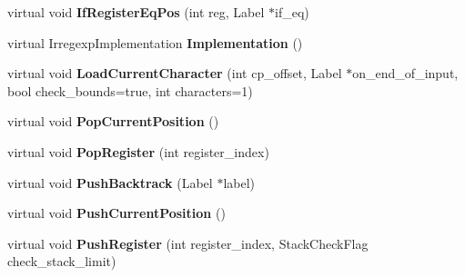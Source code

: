 \begin{DoxyCompactItemize}
\item 
\hypertarget{classv8_1_1internal_1_1_reg_exp_macro_assembler_tracer_a7de6f340567bbd0d28db32177d03995c}{}virtual void {\bfseries If\+Register\+Eq\+Pos} (int reg, Label $\ast$if\+\_\+eq)\label{classv8_1_1internal_1_1_reg_exp_macro_assembler_tracer_a7de6f340567bbd0d28db32177d03995c}

\item 
\hypertarget{classv8_1_1internal_1_1_reg_exp_macro_assembler_tracer_acb598ed5fdd8816f391f13a5518aced6}{}virtual Irregexp\+Implementation {\bfseries Implementation} ()\label{classv8_1_1internal_1_1_reg_exp_macro_assembler_tracer_acb598ed5fdd8816f391f13a5518aced6}

\item 
\hypertarget{classv8_1_1internal_1_1_reg_exp_macro_assembler_tracer_a484bc51c470fe1b603a7c744a21df877}{}virtual void {\bfseries Load\+Current\+Character} (int cp\+\_\+offset, Label $\ast$on\+\_\+end\+\_\+of\+\_\+input, bool check\+\_\+bounds=true, int characters=1)\label{classv8_1_1internal_1_1_reg_exp_macro_assembler_tracer_a484bc51c470fe1b603a7c744a21df877}

\item 
\hypertarget{classv8_1_1internal_1_1_reg_exp_macro_assembler_tracer_ad93ed40ef832641f6f3c6309fcd4cc05}{}virtual void {\bfseries Pop\+Current\+Position} ()\label{classv8_1_1internal_1_1_reg_exp_macro_assembler_tracer_ad93ed40ef832641f6f3c6309fcd4cc05}

\item 
\hypertarget{classv8_1_1internal_1_1_reg_exp_macro_assembler_tracer_a9d77d1ca2b521e5d8d6650ec9ebe9722}{}virtual void {\bfseries Pop\+Register} (int register\+\_\+index)\label{classv8_1_1internal_1_1_reg_exp_macro_assembler_tracer_a9d77d1ca2b521e5d8d6650ec9ebe9722}

\item 
\hypertarget{classv8_1_1internal_1_1_reg_exp_macro_assembler_tracer_a8a8ef8929ec481c91822bee014ce5ba4}{}virtual void {\bfseries Push\+Backtrack} (Label $\ast$label)\label{classv8_1_1internal_1_1_reg_exp_macro_assembler_tracer_a8a8ef8929ec481c91822bee014ce5ba4}

\item 
\hypertarget{classv8_1_1internal_1_1_reg_exp_macro_assembler_tracer_ad926cc957d8e139ff72057b440d4a9a9}{}virtual void {\bfseries Push\+Current\+Position} ()\label{classv8_1_1internal_1_1_reg_exp_macro_assembler_tracer_ad926cc957d8e139ff72057b440d4a9a9}

\item 
\hypertarget{classv8_1_1internal_1_1_reg_exp_macro_assembler_tracer_ac306f13fbb5e4fcc5c53a5cb0415ea03}{}virtual void {\bfseries Push\+Register} (int register\+\_\+index, Stack\+Check\+Flag check\+\_\+stack\+\_\+limit)\label{classv8_1_1internal_1_1_reg_exp_macro_assembler_tracer_ac306f13fbb5e4fcc5c53a5cb0415ea03}


\end{DoxyCompactItemize}

